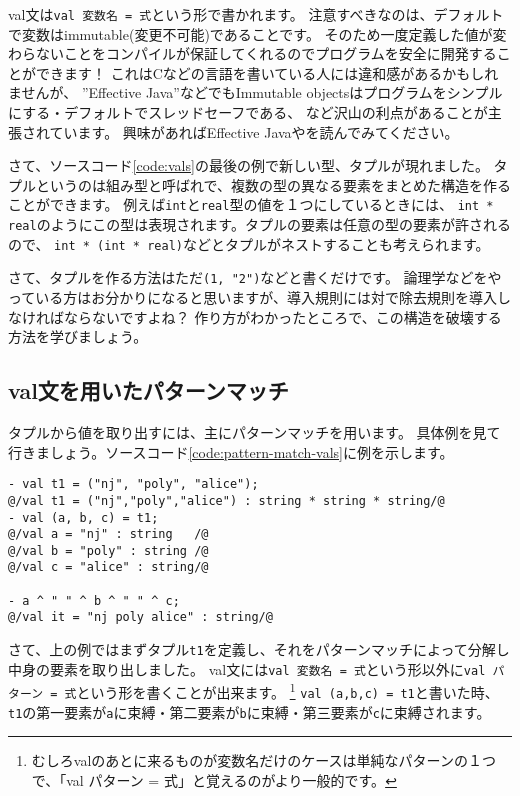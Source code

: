 \documentclass[11pt,a4paper]{article}
\begin{document}
val文は\lstinline{val 変数名 = 式}という形で書かれます。
注意すべきなのは、デフォルトで変数はimmutable(変更不可能)であることです。
そのため一度定義した値が変わらないことをコンパイルが保証してくれるのでプログラムを安全に開発することができます！
これはCなどの言語を書いている人には違和感があるかもしれませんが、
''Effective Java''などでもImmutable objectsはプログラムをシンプルにする・デフォルトでスレッドセーフである、
など沢山の利点があることが主張されています。
興味があればEffective Javaや\cite{objects-should-be-immutable}を読んでみてください。

さて、ソースコード\ref{code:vals}の最後の例で新しい型、タプルが現れました。
タプルというのは組み型と呼ばれで、複数の型の異なる要素をまとめた構造を作ることができます。
例えば\lstinline{int}と\lstinline{real}型の値を１つにしているときには、
\lstinline{int * real}のようにこの型は表現されます。タプルの要素は任意の型の要素が許されるので、
\lstinline{int * (int * real)}などとタプルがネストすることも考えられます。

さて、タプルを作る方法はただ\lstinline{(1, "2")}などと書くだけです。
論理学などをやっている方はお分かりになると思いますが、導入規則には対で除去規則を導入しなければならないですよね？
作り方がわかったところで、この構造を破壊する方法を学びましょう。

\subsection{val文を用いたパターンマッチ}

タプルから値を取り出すには、主にパターンマッチを用います。
具体例を見て行きましょう。ソースコード\ref{code:pattern-match-vals}に例を示します。

\begin{lstlisting}[caption=val文でパターンマッチ,label=code:pattern-match-vals]
- val t1 = ("nj", "poly", "alice");
@/val t1 = ("nj","poly","alice") : string * string * string/@
- val (a, b, c) = t1;
@/val a = "nj" : string   /@
@/val b = "poly" : string /@
@/val c = "alice" : string/@

- a ^ " " ^ b ^ " " ^ c;
@/val it = "nj poly alice" : string/@
\end{lstlisting}

さて、上の例ではまずタプル\lstinline{t1}を定義し、それをパターンマッチによって分解し中身の要素を取り出しました。
val文には\lstinline{val 変数名 = 式}という形以外に\lstinline{val パターン = 式}という形を書くことが出来ます。
\footnote{むしろvalのあとに来るものが変数名だけのケースは単純なパターンの１つで、「val パターン = 式」と覚えるのがより一般的です。}
\lstinline{val (a,b,c) = t1}と書いた時、\lstinline{t1}の第一要素が\lstinline{a}に束縛・第二要素が\lstinline{b}に束縛・第三要素が\lstinline{c}に束縛されます。
\end{document}
